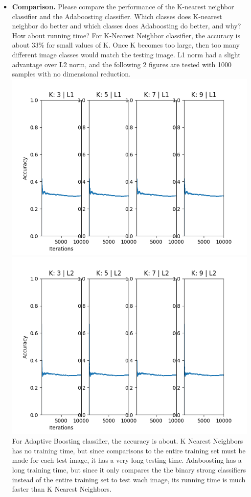 \documentclass[11pt]{article}
\begin{document}
    \begin{itemize}
        \item \textbf{Comparison.} Please compare the performance of the K-nearest neighbor classifier and the
        Adaboosting classifier. Which classes does K-nearest neighbor do better and which classes does Adaboosting do better, and
        why? How about running time?
        For K-Nearest Neighbor classifier, the accuracy is about 33\% for small values of K. Once K becomes too
        large, then too many different image classes would match the testing image. L1 norm had a slight advantage
        over L2 norm, and the following 2 figures are tested with 1000 samples with no dimensional reduction.\newline
        \includegraphics[width=\textwidth]{Output Pictures/Nearest Neighbors L1}
        \includegraphics[width=\textwidth]{Output Pictures/Nearest Neighbors L2}
        For Adaptive Boosting classifier, the accuracy is about.
        K Nearest Neighbors has no training time, but since comparisons to the entire training set must be made for
        each test image, it has a very long testing time. Adaboosting has a long training time, but since it only
        compares the the binary strong classifiers instead of the entire training set to test wach image, its running
        time is much faster than K Nearest Neighbors.


\end{itemize}
\end{document}
